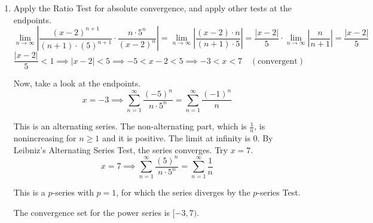 \documentclass[a4paper, 12pt]{article}
\begin{document}
\begin{enumerate}[leftmargin=*,label=\textbf{\arabic*.}]
\item Apply the Ratio Test for absolute convergence, and apply other tests at the endpoints.
\[\lim_{n\to\infty}\left|\frac{(x-2)^{n+1}}{(n+1)\cdot(5)^{n+1}}\cdot\frac{n\cdot5^n}{(x-2)^n}\right|=\lim_{n\to\infty}\left|\frac{\left(x-2\right)\cdot n}{(n+1)\cdot5}\right|=\frac{|x-2|}5\cdot\lim_{n\to\infty}\left|\frac{n}{n+1}\right|=\frac{|x-2|}5\]
\[\frac{|x-2|}5<1\implies |x-2|<5\implies -5<x-2<5\implies -3<x<7 \quad (\text{convergent})\]

Now, take a look at the endpoints.
\[x=-3\implies \sum_{n=1}^{\infty}\frac{(-5)^n}{n\cdot5^n}=\sum_{n=1}^{\infty}\frac{(-1)^n}n\]

This is an alternating series. The non-alternating part, which is $\frac1n$, is nonincreasing for $n\geq1$ and it is positive. The limit at infinity is $0$. By Leibniz's Alternating Series Test, the series converges. Try $x=7$.
\[x=7\implies\sum_{n=1}^{\infty}\frac{(5)^n}{n\cdot5^n}=\sum_{n=1}^{\infty}\frac1n\]

This is a $p$-series with $p=1$, for which the series diverges by the $p$-series Test.

The convergence set for the power series is $\boxed{[-3,7)}$.

\end{enumerate}
\end{document}
